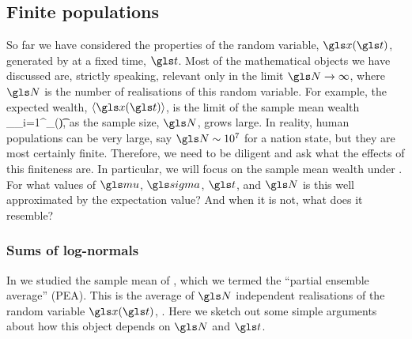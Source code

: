 
\subsection{Finite populations}
So far we have considered the properties of the random variable, $\x(\t)$, generated by \GBM at a fixed time, $\t$. Most of the mathematical objects we have discussed are, strictly speaking, relevant only in the limit $\N\to\infty$, where $\N$ is the number of realisations of this random variable. For example, the expected wealth, $\ave{\x(\t)}$, is the limit of the sample mean wealth
\be
\ave{\x(\t)}_\N \equiv {}\sum_{i=1}^\N \x_\gi(\t),
\ee
as the sample size, $\N$, grows large. In reality, human populations can be very large, say $\N\sim10^7$ for a nation state, but they are most certainly finite. Therefore, we need to be diligent and ask what the effects of this finiteness are. In particular, we will focus on the sample mean wealth under \GBM. For what values of $\gmu$, $\gsigma$, $\t$, and $\N$ is this well approximated by the expectation value? And when it is not, what does it resemble?

\subsubsection{Sums of log-normals}
In \cite{PetersKlein2013} we studied the sample mean of \GBM, which we termed the ``partial ensemble average'' (PEA). This is the average of $\N$ independent realisations of the random variable $\x(\t)$, . Here we sketch out some simple arguments about how this object depends on $\N$ and $\t$.

